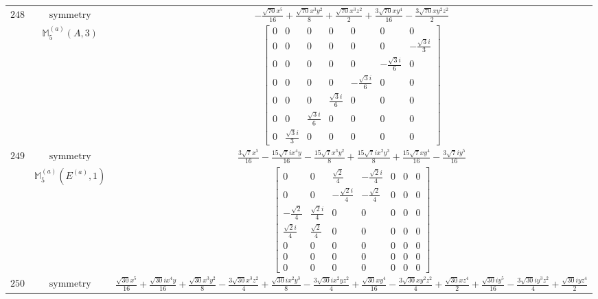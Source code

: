\documentclass[fleqn,8pt,landscape]{jsarticle}
\begin{document}
\begin{longtable}{ccc}
$ 248 $ & $ \text{symmetry} $ & $ - \frac{\sqrt{70} x^{5}}{16} + \frac{\sqrt{70} x^{3} y^{2}}{8} + \frac{\sqrt{70} x^{3} z^{2}}{2} + \frac{3 \sqrt{70} x y^{4}}{16} - \frac{3 \sqrt{70} x y^{2} z^{2}}{2} $ \\
$  $ & $ \mathbb{M}_{5}^{(a)}(A,3) $ & $ \begin{bmatrix} 0 & 0 & 0 & 0 & 0 & 0 & 0 \\ 0 & 0 & 0 & 0 & 0 & 0 & - \frac{\sqrt{3} i}{3} \\ 0 & 0 & 0 & 0 & 0 & - \frac{\sqrt{3} i}{6} & 0 \\ 0 & 0 & 0 & 0 & - \frac{\sqrt{3} i}{6} & 0 & 0 \\ 0 & 0 & 0 & \frac{\sqrt{3} i}{6} & 0 & 0 & 0 \\ 0 & 0 & \frac{\sqrt{3} i}{6} & 0 & 0 & 0 & 0 \\ 0 & \frac{\sqrt{3} i}{3} & 0 & 0 & 0 & 0 & 0 \end{bmatrix} $ \\ \hline
$ 249 $ & $ \text{symmetry} $ & $ \frac{3 \sqrt{7} x^{5}}{16} - \frac{15 \sqrt{7} i x^{4} y}{16} - \frac{15 \sqrt{7} x^{3} y^{2}}{8} + \frac{15 \sqrt{7} i x^{2} y^{3}}{8} + \frac{15 \sqrt{7} x y^{4}}{16} - \frac{3 \sqrt{7} i y^{5}}{16} $ \\
$  $ & $ \mathbb{M}_{5}^{(a)}(E^{(a)},1) $ & $ \begin{bmatrix} 0 & 0 & \frac{\sqrt{2}}{4} & - \frac{\sqrt{2} i}{4} & 0 & 0 & 0 \\ 0 & 0 & - \frac{\sqrt{2} i}{4} & - \frac{\sqrt{2}}{4} & 0 & 0 & 0 \\ - \frac{\sqrt{2}}{4} & \frac{\sqrt{2} i}{4} & 0 & 0 & 0 & 0 & 0 \\ \frac{\sqrt{2} i}{4} & \frac{\sqrt{2}}{4} & 0 & 0 & 0 & 0 & 0 \\ 0 & 0 & 0 & 0 & 0 & 0 & 0 \\ 0 & 0 & 0 & 0 & 0 & 0 & 0 \\ 0 & 0 & 0 & 0 & 0 & 0 & 0 \end{bmatrix} $ \\ \hline
$ 250 $ & $ \text{symmetry} $ & $ \frac{\sqrt{30} x^{5}}{16} + \frac{\sqrt{30} i x^{4} y}{16} + \frac{\sqrt{30} x^{3} y^{2}}{8} - \frac{3 \sqrt{30} x^{3} z^{2}}{4} + \frac{\sqrt{30} i x^{2} y^{3}}{8} - \frac{3 \sqrt{30} i x^{2} y z^{2}}{4} + \frac{\sqrt{30} x y^{4}}{16} - \frac{3 \sqrt{30} x y^{2} z^{2}}{4} + \frac{\sqrt{30} x z^{4}}{2} + \frac{\sqrt{30} i y^{5}}{16} - \frac{3 \sqrt{30} i y^{3} z^{2}}{4} + \frac{\sqrt{30} i y z^{4}}{2} $ \\

\end{longtable}
\end{document}
